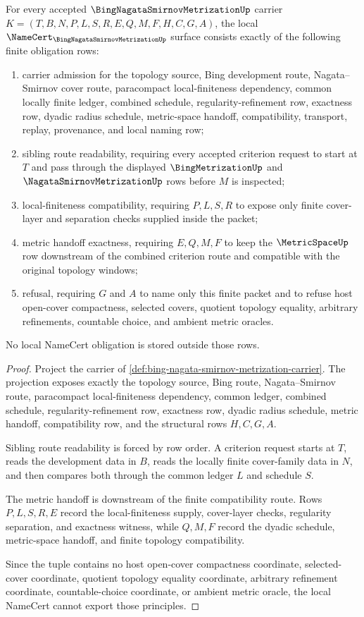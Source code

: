 \begin{theorem}
\label{thm:bing-nagata-smirnov-metrization-namecert-obligations}
For every accepted $\BingNagataSmirnovMetrizationUp$ carrier $K=(T,B,N,P,L,S,R,E,Q,M,F,H,C,G,A)$, the local $\NameCert_{\BingNagataSmirnovMetrizationUp}$ surface consists exactly of the following finite obligation rows:
\begin{enumerate}
\item carrier admission for the topology source, Bing development route, Nagata--Smirnov cover route, paracompact local-finiteness dependency, common locally finite ledger, combined schedule, regularity-refinement row, exactness row, dyadic radius schedule, metric-space handoff, compatibility, transport, replay, provenance, and local naming row;
\item sibling route readability, requiring every accepted criterion request to start at $T$ and pass through the displayed $\BingMetrizationUp$ and $\NagataSmirnovMetrizationUp$ rows before $M$ is inspected;
\item local-finiteness compatibility, requiring $P,L,S,R$ to expose only finite cover-layer and separation checks supplied inside the packet;
\item metric handoff exactness, requiring $E,Q,M,F$ to keep the $\MetricSpaceUp$ row downstream of the combined criterion route and compatible with the original topology windows;
\item refusal, requiring $G$ and $A$ to name only this finite packet and to refuse host open-cover compactness, selected covers, quotient topology equality, arbitrary refinements, countable choice, and ambient metric oracles.
\end{enumerate}
No local NameCert obligation is stored outside those rows.
\end{theorem}
\begin{proof}
Project the carrier of \autoref{def:bing-nagata-smirnov-metrization-carrier}. The projection exposes exactly the topology source, Bing route, Nagata--Smirnov route, paracompact local-finiteness dependency, common ledger, combined schedule, regularity-refinement row, exactness row, dyadic radius schedule, metric handoff, compatibility row, and the structural rows $H,C,G,A$.

Sibling route readability is forced by row order. A criterion request starts at $T$, reads the development data in $B$, reads the locally finite cover-family data in $N$, and then compares both through the common ledger $L$ and schedule $S$.

The metric handoff is downstream of the finite compatibility route. Rows $P,L,S,R,E$ record the local-finiteness supply, cover-layer checks, regularity separation, and exactness witness, while $Q,M,F$ record the dyadic schedule, metric-space handoff, and finite topology compatibility.

Since the tuple contains no host open-cover compactness coordinate, selected-cover coordinate, quotient topology equality coordinate, arbitrary refinement coordinate, countable-choice coordinate, or ambient metric oracle, the local NameCert cannot export those principles.
\end{proof}


